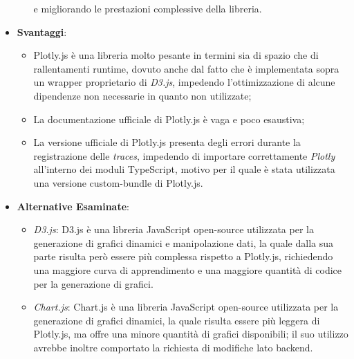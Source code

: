 \begin{itemize}
\begin{itemize}
                        e migliorando le prestazioni complessive della libreria.
            \end{itemize}
      \item \textbf{Svantaggi}:
            \begin{itemize}
                  \item Plotly.js è una libreria molto pesante in termini sia di spazio che di rallentamenti runtime, dovuto anche dal fatto che è implementata sopra un wrapper proprietario di \textit{D3.js},
                        impedendo l'ottimizzazione di alcune dipendenze non necessarie in quanto non utilizzate;
                  \item La documentazione ufficiale di Plotly.js è vaga e poco esaustiva;
                  \item La versione ufficiale di Plotly.js presenta degli errori durante la registrazione delle \textit{traces}, impedendo di importare correttamente
                        \textit{Plotly} all'interno dei moduli TypeScript, motivo per il quale è stata utilizzata una versione custom-bundle di Plotly.js.
            \end{itemize}
      \item \textbf{Alternative Esaminate}:
            \begin{itemize}
                  \item \textit{D3.js}: D3.js è una libreria JavaScript open-source utilizzata per la generazione di grafici dinamici e manipolazione dati, la quale dalla sua parte risulta però
                        essere più complessa rispetto a Plotly.js, richiedendo una maggiore curva di apprendimento e una maggiore quantità di codice per la generazione di grafici.
                  \item \textit{Chart.js}: Chart.js è una libreria JavaScript open-source utilizzata per la generazione di grafici dinamici, la quale risulta essere più leggera di Plotly.js,
                        ma offre una minore quantità di grafici disponibili; il suo utilizzo avrebbe inoltre comportato la richiesta di modifiche lato backend.
            \end{itemize}
\end{itemize}

